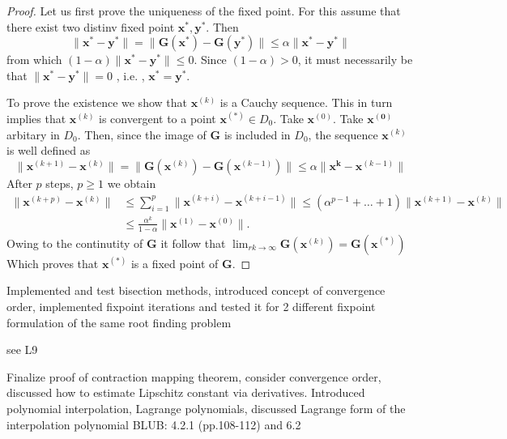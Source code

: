 \documentclass{article}
\theoremstyle{remark}
\begin{document}
\begin{proof}
  Let us first prove the uniqueness of the fixed point. For this assume that there exist two distinv fixed point $\mathbf{x}^{*}, \mathbf{y}^{*}$. Then \[
  \|\mathbf{x}^{*} - \mathbf{y}^{*}\| =  \|\mathbf{G} \left( \mathbf{x}^{*} \right) - \mathbf{G}\left( \mathbf{y}^{*} \right)\| \le \alpha \|\mathbf{x}^{*} - \mathbf{y}^{*}\|
  \] from which $\left( 1- \alpha \right) \|\mathbf{x^{*} - \mathbf{y}^{*}} \| \le 0$. Since $\left( 1- \alpha \right) > 0$, it must necessarily be that $\|\mathbf{x}^{*} - \mathbf{y}^{*}\| = 0$ , i.e. , $\mathbf{x}^{*} = \mathbf{y}^{*}$.
  \par  
  To prove the existence we show that $\mathbf{x}^{(k)}$ is a Cauchy sequence. This in turn implies that $\mathbf{x}^{(k)}$ is convergent to a point $\mathbf{x}^{(*)} \in D_0$. Take $\mathbf{x}^{(0)}$. Take $\mathbf{x^{(0)}}$ arbitary in $D_0$. Then, since the image of $\mathbf{G}$ is included in $D_0$, the sequence $\mathbf{x}^{(k)}$ is well defined as \[
  \|\mathbf{x}^{(k+1)} - \mathbf{x}^{(k)}\| = \|\mathbf{G}\left( \mathbf{x}^{(k)} \right) - \mathbf{G}\left( \mathbf{x}^{(k-1)} \right)\| \le \alpha \|\mathbf{x^{k}} - \mathbf{x}^{(k-1)}\|
  \] 
  After $p$ steps, $p\ge 1$ we obtain 
  \begin{align}
    \|\mathbf{x}^{(k+p)}- \mathbf{x}^{(k)}\| &\le \sum_{i=1}^{p} \|\mathbf{x}^{(k+i)} - \mathbf{x}^{(k+i-1)}\| \le \left( \alpha ^{p-1} + \ldots + 1 \right) \|\mathbf{x}^{(k+1)}- \mathbf{x}^{(k)}\| \\
                                             &\le \frac{\alpha ^{k}}{ 1- \alpha } \|\mathbf{x}^{(1)} - \mathbf{x}^{(0)}\|
  .\end{align}
  Owing to the continutity of $\mathbf{G}$ it follow that $\lim_{rk \to \infty} \mathbf{G}\left( \mathbf{x}^{(k)} \right) = \mathbf{G}\left( \mathbf{x}^{(*)} \right)$ Which proves that $\mathbf{x^{(*)}}$ is a fixed point of $\mathbf{G}$.


\end{proof}

\begin{tcolorbox}
  Implemented and test bisection methods, introduced concept of convergence order, implemented fixpoint iterations and tested it for 2 different fixpoint formulation of the same root finding problem 
  \par
  see L9
\end{tcolorbox}

\begin{tcolorbox}
  Finalize proof of contraction mapping theorem, consider convergence order, discussed how to estimate Lipschitz constant via derivatives. Introduced polynomial interpolation, Lagrange polynomials, discussed Lagrange form of the interpolation polynomial	
  BLUB: 4.2.1 (pp.108-112) and 6.2
\end{tcolorbox}
\end{document}
